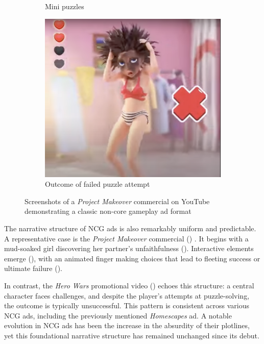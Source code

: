 \documentclass[a4paper, 12pt, mla]{homework}
\begin{document}
\begin{figure}[bt]
\begin{subfigure}[t]{0.3\linewidth}
		\caption{Mini puzzles}
		\label{FIG:PM-Puzzle}
	\end{subfigure}
	\begin{subfigure}[t]{0.3\linewidth}\centering
		\includegraphics[width=\linewidth]{PM-Fail.png}
		\caption{Outcome of failed puzzle attempt}
		\label{FIG:PM-Fail}
	\end{subfigure}
	\captionsetup{width=0.92\linewidth}
	\caption{Screenshots of a \textit{Project Makeover} commercial on YouTube demonstrating a classic non-core gameplay ad format \protect\cite{DG:ProjectMakeover, YT:ProjectMakeover-Mud}}
	\label{FIG:PM}
\end{figure}

The narrative structure of NCG ads is also remarkably uniform and predictable. 
A representative case is the \textit{Project Makeover} commercial () \cite{DG:ProjectMakeover, YT:ProjectMakeover-Mud}. 
It begins with a mud-soaked girl discovering her partner's unfaithfulness (). Interactive elements emerge (), with an animated finger making choices that lead to fleeting success or ultimate failure ().

In contrast, the \textit{Hero Wars} promotional video () \cite{DG:HeroWars,YT:HeroWars-Legend} echoes this structure: a central character faces challenges, and despite the player's attempts at puzzle-solving, the outcome is typically unsuccessful.
This pattern is consistent across various NCG ads, including the previously mentioned \textit{Homescapes} ad. 
A notable evolution in NCG ads has been the increase in the absurdity of their plotlines, yet this foundational narrative structure has remained unchanged since its debut.
\end{document}
